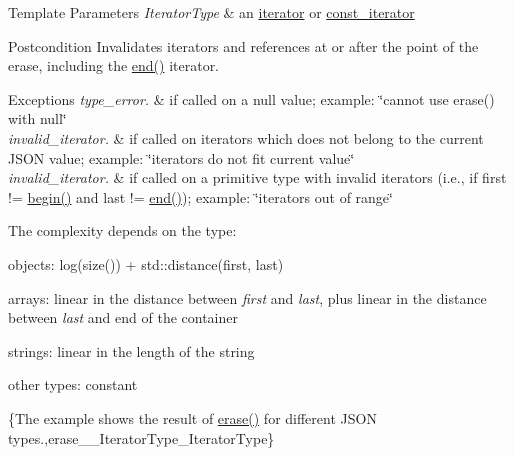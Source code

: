 \begin{DoxyTemplParams}{Template Parameters}
{\em Iterator\+Type} & an \hyperlink{classnlohmann_1_1basic__json_a099316232c76c034030a38faa6e34dca}{iterator} or \hyperlink{classnlohmann_1_1basic__json_a41a70cf9993951836d129bb1c2b3126a}{const\+\_\+iterator}\\
\hline
\end{DoxyTemplParams}
\begin{DoxyPostcond}{Postcondition}
Invalidates iterators and references at or after the point of the erase, including the {\ttfamily \hyperlink{classnlohmann_1_1basic__json_a13e032a02a7fd8a93fdddc2fcbc4763c}{end()}} iterator.
\end{DoxyPostcond}

\begin{DoxyExceptions}{Exceptions}
{\em type\+\_\+error.} & if called on a {\ttfamily null} value; example\+: {\ttfamily \char`\"{}cannot use
erase() with null\char`\"{}} \\
\hline
{\em invalid\+\_\+iterator.} & if called on iterators which does not belong to the current J\+S\+ON value; example\+: {\ttfamily \char`\"{}iterators do not fit current value\char`\"{}} \\
\hline
{\em invalid\+\_\+iterator.} & if called on a primitive type with invalid iterators (i.\+e., if {\ttfamily first != \hyperlink{classnlohmann_1_1basic__json_a0ff28dac23f2bdecee9564d07f51dcdc}{begin()}} and {\ttfamily last != \hyperlink{classnlohmann_1_1basic__json_a13e032a02a7fd8a93fdddc2fcbc4763c}{end()}}); example\+: {\ttfamily \char`\"{}iterators out of range\char`\"{}}\\
\hline
\end{DoxyExceptions}
The complexity depends on the type\+:
\begin{DoxyItemize}
\item objects\+: {\ttfamily log(size()) + std\+::distance(first, last)}
\item arrays\+: linear in the distance between {\itshape first} and {\itshape last}, plus linear in the distance between {\itshape last} and end of the container
\item strings\+: linear in the length of the string
\item other types\+: constant
\end{DoxyItemize}

\{The example shows the result of {\ttfamily \hyperlink{classnlohmann_1_1basic__json_a068a16e76be178e83da6a192916923ed}{erase()}} for different J\+S\+ON types.,erase\+\_\+\+\_\+\+Iterator\+Type\+\_\+\+Iterator\+Type\}

